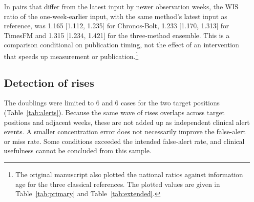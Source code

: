 \documentclass[11pt]{article}
\newcommand{\gentable}[1]{\adjustbox{max width=\linewidth}{}}
\begin{document}
\begin{table}[tbp]\centering\small
\caption{Post-review exploratory summary that compares only the freshness of the published input within the same method. Intervals are not adjusted for multiple comparisons. Even for the same statistic, the interval endpoints differ slightly from Table~\ref{tab:primary} because resampling used a different random stream. Horizons and calendar periods were not randomly assigned. TimesFM covers only the period after its publication, so the evaluation periods of the three rows are not the same. The order of the ratios across rows is not to be read as a ranking of methods.}\label{tab:ownage}
\gentable{tab_own_age}
\end{table}

In pairs that differ from the latest input by newer observation weeks, the WIS ratio of the one-week-earlier input, with the same method's latest input as reference, was 1.165 [1.112, 1.235] for Chronos-Bolt, 1.233 [1.170, 1.313] for TimesFM and 1.315 [1.234, 1.421] for the three-method ensemble. This is a comparison conditional on publication timing, not the effect of an intervention that speeds up measurement or publication.\footnote{The original manuscript also plotted the national ratios against information age for the three classical references. The plotted values are given in Table~\ref{tab:primary} and Table~\ref{tab:extended}.}

\subsection{Detection of rises}

\begin{table}[tbp]\centering\small
\caption{Detection of doublings (a rise to at least twice the value of two weeks earlier) by alerts from point forecasts, with one-week-earlier input, compared with the latest fixed three-method ensemble on the same cases. The offset is the target date minus the issue date.}\label{tab:alerts}
\gentable{tab_alerts}
\end{table}

The doublings were limited to 6 and 6 cases for the two target positions (Table~\ref{tab:alerts}). Because the same wave of rises overlaps across target positions and adjacent weeks, these are not added up as independent clinical alert events. A smaller concentration error does not necessarily improve the false-alert or miss rate. Some conditions exceeded the intended false-alert rate, and clinical usefulness cannot be concluded from this sample.
\end{document}
